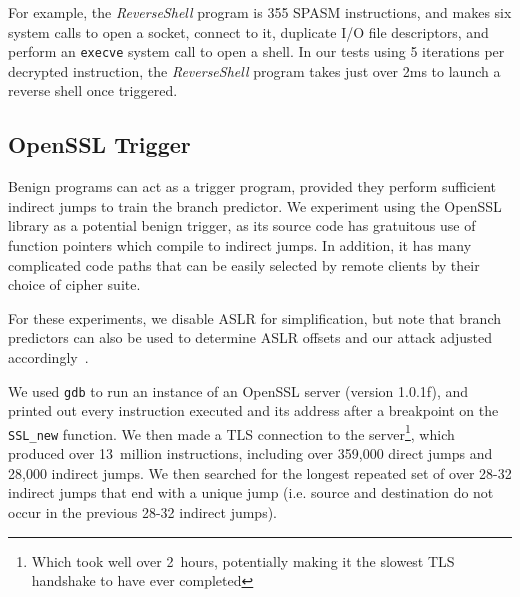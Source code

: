 
For example, the \textit{ReverseShell} program is 355 SPASM instructions, and
makes six system calls to open a socket,
connect to it, duplicate I/O file descriptors, and perform an \texttt{execve}
system call to open a shell.
In our tests using 5 iterations per decrypted instruction, the
\textit{ReverseShell} program takes just over 2ms to launch a reverse shell
once triggered.


\FigSpasmModel

\subsection{OpenSSL Trigger}
\label{subsec:openssl}

Benign programs can act as a trigger program, provided they perform sufficient
indirect jumps to train the branch predictor. We experiment using the OpenSSL
library as a potential benign trigger, as its source code has gratuitous use of
function pointers which compile to indirect jumps. In addition, it has many
complicated code paths that can be easily selected by remote clients by their
choice of cipher suite.

For these experiments, we disable ASLR for simplification, but note that
branch predictors can also be used to determine ASLR offsets and our attack adjusted
accordingly~\cite{evtyushkin2016jump}.

We used \texttt{gdb} to run an instance of an OpenSSL server (version 1.0.1f),
and printed out every instruction executed and its address after a breakpoint on
the \texttt{SSL\_new} function. We then made a TLS connection to the
server\footnote{Which took well over 2~hours, potentially making it the slowest
TLS handshake to have ever completed},
which produced over 13~million instructions, including over 359,000 direct jumps
and 28,000 indirect jumps. We then searched for the longest repeated set of over
28-32 indirect jumps that end with a unique jump (i.e. source and destination do
not occur in the previous 28-32 indirect jumps).

